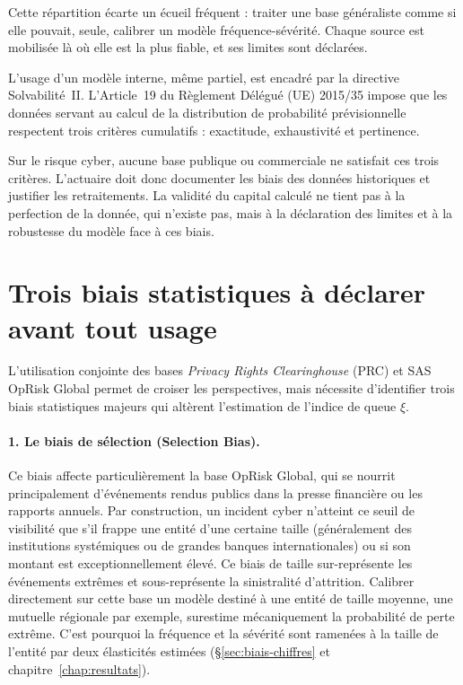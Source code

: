 Cette répartition écarte un écueil fréquent : traiter une base généraliste comme si elle
pouvait, seule, calibrer un modèle fréquence-sévérité. Chaque source est mobilisée là où elle
est la plus fiable, et ses limites sont déclarées.



L'usage d'un modèle interne, même partiel, est encadré par la directive Solvabilité~II.
L'Article~19 du Règlement Délégué (UE) 2015/35 impose que les données servant au calcul de la
distribution de probabilité prévisionnelle respectent trois critères cumulatifs : exactitude,
exhaustivité et pertinence.

Sur le risque cyber, aucune base publique ou commerciale ne satisfait ces trois critères.
L'actuaire doit donc documenter les biais des données historiques et justifier les
retraitements. La validité du capital calculé ne tient pas à la perfection de la donnée, qui
n'existe pas, mais à la déclaration des limites et à la robustesse du modèle face à ces
biais.




\section{Trois biais statistiques à déclarer avant tout usage}
\label{sec:trois-biais}

L'utilisation conjointe des bases \emph{Privacy Rights Clearinghouse} (PRC) et SAS OpRisk Global permet de croiser les perspectives, mais nécessite d'identifier trois biais statistiques majeurs qui altèrent l'estimation de l'indice de queue $\xi$.

\paragraph{1. Le biais de sélection (Selection Bias).}
Ce biais affecte particulièrement la base OpRisk Global, qui se nourrit principalement d'événements rendus publics dans la presse financière ou les rapports annuels. Par construction, un incident cyber n'atteint ce seuil de visibilité que s'il frappe une entité d'une certaine taille (généralement des institutions systémiques ou de grandes banques internationales) ou si son montant est exceptionnellement élevé.
Ce biais de taille sur-représente les événements extrêmes et sous-représente la sinistralité
d'attrition. Calibrer directement sur cette base un modèle destiné à une entité de taille
moyenne, une mutuelle régionale par exemple, surestime mécaniquement la probabilité de perte
extrême. C'est pourquoi la fréquence et la sévérité sont ramenées à la taille de l'entité par
deux élasticités estimées (\S\ref{sec:biais-chiffres} et chapitre~\ref{chap:resultats}).

